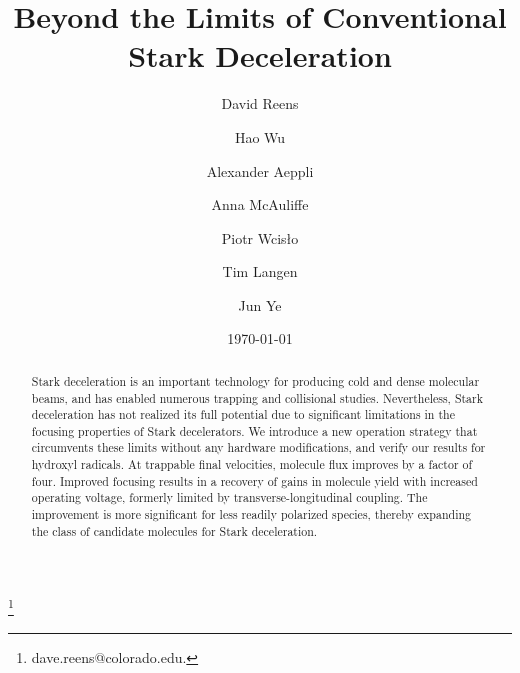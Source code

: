 \documentclass[%
 reprint,
 amsmath,amssymb,
 aps,
prl,
]{revtex4-1}
\begin{document}
\title{Beyond the Limits of Conventional Stark Deceleration}%

\author{David Reens}
\thanks{dave.reens@colorado.edu.}


\author{Hao Wu}

\author{Alexander Aeppli}
\author{Anna McAuliffe}
\author{Piotr Wcis\l o}
\author{Tim Langen}%

\author{Jun Ye}


\date{\today}



\begin{abstract}
Stark deceleration is an important technology for producing cold and dense molecular beams, and has enabled numerous trapping and collisional studies.
Nevertheless, Stark deceleration has not realized its full potential due to significant limitations in the focusing properties of Stark decelerators.
We introduce a new operation strategy that circumvents these limits without any hardware modifications, and verify our results for hydroxyl radicals.
At trappable final velocities, molecule flux improves by a factor of four.
Improved focusing results in a recovery of gains in molecule yield with increased operating voltage, formerly limited by transverse-longitudinal coupling.
The improvement is more significant for less readily polarized species, thereby expanding the class of candidate molecules for Stark deceleration.
\end{abstract}

\maketitle
\end{document}
